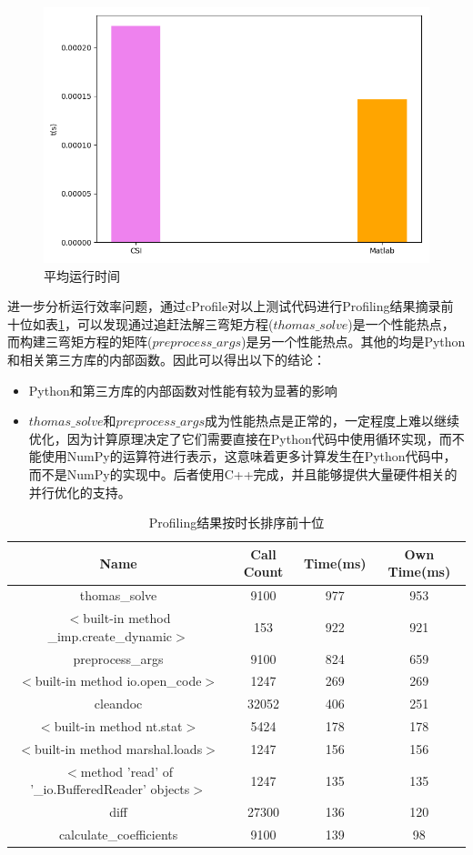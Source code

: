 \documentclass[a4paper,twoside]{article}
\begin{document}
\begin{spacing}{1.2}
\begin{figure}[h]
	\centering
	\caption{平均运行时间}
	\label{fig:rubtimeaverage}
	\includegraphics[width=0.5\linewidth]{average_runtime.png}
\end{figure}

进一步分析运行效率问题，通过cProfile对以上测试代码进行Profiling结果摘录前十位如表\ref{tbl:profiling}，可以发现通过追赶法解三弯矩方程($thomas\_solve$)是一个性能热点，而构建三弯矩方程的矩阵($preprocess\_args$)是另一个性能热点。其他的均是Python和相关第三方库的内部函数。因此可以得出以下的结论：

\begin{itemize}
	\item Python和第三方库的内部函数对性能有较为显著的影响
	\item $thomas\_solve$和$preprocess\_args$成为性能热点是正常的，一定程度上难以继续优化，因为计算原理决定了它们需要直接在Python代码中使用循环实现，而不能使用NumPy的运算符进行表示，这意味着更多计算发生在Python代码中，而不是NumPy的实现中。后者使用C++完成，并且能够提供大量硬件相关的并行优化的支持。
\end{itemize}

\begin{table}[h]
	\begin{center}
		\caption{Profiling结果按时长排序前十位}
		\label{tbl:profiling}
		\begin{tabular}{cccc}
			\toprule 
			Name & Call Count & Time(ms) & Own Time(ms) \\
			\midrule
			thomas\_solve &	9100&	977&	953\\
			$<$built-in method \_imp.create\_dynamic$>$&	153&	922&	921\\
			preprocess\_args	&9100&	824&	659\\
			$<$built-in method io.open\_code$>$&	1247&	269&	269\\
			cleandoc&	32052&	406	&251\\
			$<$built-in method nt.stat$>$&	5424&	178	&178\\
			$<$built-in method marshal.loads$>$&	1247&	156&	156\\
			$<$method 'read' of '\_io.BufferedReader' objects$>$&	1247&	135&	135\\
			diff&	27300	&136&	120\\
			calculate\_coefficients&	9100&	139	&98\\
			\bottomrule
		\end{tabular}
	\end{center}
\end{table}



\end{spacing}
\end{document}
